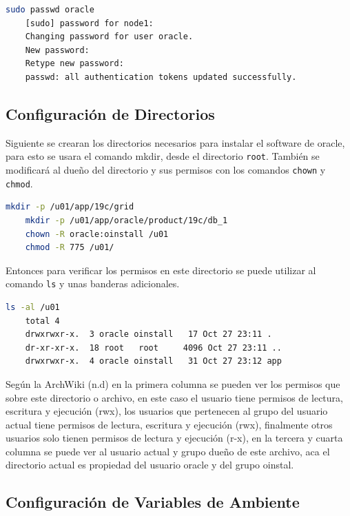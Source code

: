 \documentclass{article}
\begin{document}
\begin{lstlisting}[style=mystyle,language=bash]
	sudo passwd oracle
	[sudo] password for node1:
	Changing password for user oracle.
	New password:
	Retype new password:
	passwd: all authentication tokens updated successfully.
\end{lstlisting}

\subsection{Configuración de Directorios}

Siguiente se crearan los directorios necesarios para instalar el software de oracle, para esto se usara el comando mkdir, desde el directorio \texttt{root}. También se modificará al dueño del directorio y sus permisos con los comandos \texttt{chown} y \texttt{chmod}.

\begin{lstlisting}[style=mystyle,language=bash]
	mkdir -p /u01/app/19c/grid
	mkdir -p /u01/app/oracle/product/19c/db_1
	chown -R oracle:oinstall /u01
	chmod -R 775 /u01/
\end{lstlisting}

Entonces para verificar los permisos en este directorio se puede utilizar al comando \texttt{ls} y unas banderas adicionales.

\begin{lstlisting}[style=mystyle,language=bash]
	ls -al /u01
	total 4
	drwxrwxr-x.  3 oracle oinstall   17 Oct 27 23:11 .
	dr-xr-xr-x.  18 root   root 	4096 Oct 27 23:11 ..
	drwxrwxr-x.  4 oracle oinstall   31 Oct 27 23:12 app
\end{lstlisting}

Según la ArchWiki (n.d) en la primera columna se pueden ver los permisos que sobre este directorio o archivo, en este caso el usuario tiene permisos de lectura, escritura y ejecución (rwx), los usuarios que pertenecen al grupo del usuario actual tiene permisos de lectura, escritura y ejecución (rwx), finalmente otros usuarios solo tienen permisos de lectura y ejecución (r-x), en la tercera y cuarta columna se puede ver al usuario actual y grupo dueño de este archivo, aca el directorio actual es propiedad del usuario oracle y del grupo oinstal.

\subsection{Configuración de Variables de Ambiente}
\end{document}
